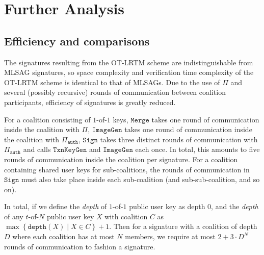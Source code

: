 \documentclass{mrl}
\theoremstyle{definition}
\begin{document}



\section{Further Analysis}

\subsection{Efficiency and comparisons}

The signatures resulting from the OT-LRTM scheme are indistinguishable from MLSAG signatures, so space complexity and verification time complexity of the OT-LRTM scheme is identical to that of MLSAGs. Due to the use of $\Pi$ and several (possibly recursive) rounds of communication between coalition participants, efficiency of signatures is greatly reduced. 

For a coalition consisting of $1$-of-$1$ keys, $\texttt{Merge}$ takes one round of communication inside the coalition with $\Pi$, $\texttt{ImageGen}$ takes one round of communication inside the coalition with $\Pi_{\texttt{auth}}$, $\texttt{Sign}$ takes three distinct rounds of communication with $\Pi_{\texttt{auth}}$ and calls $\texttt{TxnKeyGen}$ and $\texttt{ImageGen}$ each once. In total, this amounts to five rounds of communication inside the coalition per signature. For a coalition containing shared user keys for sub-coalitions, the rounds of communication in $\texttt{Sign}$ must also take place inside each sub-coalition (and sub-sub-coalition, and so on).

In total, if we define the \textit{depth} of $1$-of-$1$ public user key as depth $0$, and the \textit{depth} of any $t$-of-$N$ public user key $X$ with coalition $C$ as $\max\left\{\texttt{depth}(X) \mid X \in C\right\}+1$. Then for a signature with a coalition of depth $D$ where each coalition has at most $N$ members, we require at most $2 + 3\cdot D^N$ rounds of communication to fashion a signature.
\end{document}
